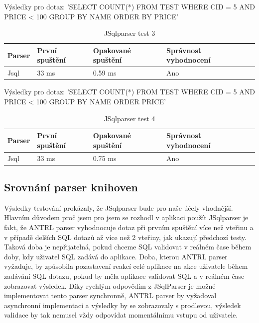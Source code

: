 \documentclass[czech,bachelor,public,dept460,male,cpdeclaration,twoside]{diploma}
\begin{document}
\begin{table}[!htbp]
	\centering
	\caption{JSqlparser test 3}
	Výsledky pro dotaz: 'SELECT COUNT(*) FROM TEST WHERE CID = 5 AND PRICE < 100 GROUP BY NAME ORDER BY PRICE'
	\vskip 0.1cm
	\label{tab:jsql3}
	\begin{tabular}{lllll}
		\toprule
		Parser & První spuštění & Opakované spuštění & Správnost vyhodnocení\\
		\midrule
		Jsql & 33 ms & 0.59 ms & Ano \\
		\midrule
	\end{tabular}
\end{table}

\begin{table}[!htbp]
	\centering
	\caption{JSqlparser test 4}
	Výsledky pro dotaz: 'SELECT COUNT(*) FROM TEST WHERE CID = 5 AND PRICE < 100 GROUP BY NAME ORDER PRICE'
	\vskip 0.1cm
	\label{tab:jsql4}
	\begin{tabular}{lllll}
		\toprule
		Parser & První spuštění & Opakované spuštění & Správnost vyhodnocení\\
		\midrule
		Jsql & 33 ms & 0.75 ms & Ano \\
		\midrule
	\end{tabular}
\end{table}


\subsection{Srovnání parser knihoven}
Výsledky testování prokázaly, že JSqlparser bude pro naše účely vhodnější. Hlavním důvodem proč jsem pro jsem se rozhodl v aplikaci použít JSqlparser je fakt, že ANTRL parser vyhodnocuje dotaz při prvním spuštění více než vteřinu a v případě delších SQL dotazů až více než 2 vteřiny, jak ukazují předchozí testy. Taková doba je nepřijatelná, pokud chceme SQL validovat v reálném čase během doby, kdy uživatel SQL zadává do aplikace. Doba, kterou ANTRL parser vyžaduje, by způsobila pozastavení reakcí celé aplikace na akce uživatele během zadávání SQL dotazu, pokud by měla aplikace validovat SQL a v reálném čase zobrazovat výsledek. Díky rychlým odpovědím z JSqlParser je možné implementovat tento parser synchronně, ANTRL parser by vyžadoval asynchronní implementaci a výsledky by se zobrazovaly s prodlevou, výsledek validace by tak nemusel vždy odpovídat momentálnímu vstupu od uživatele.
\end{document}
